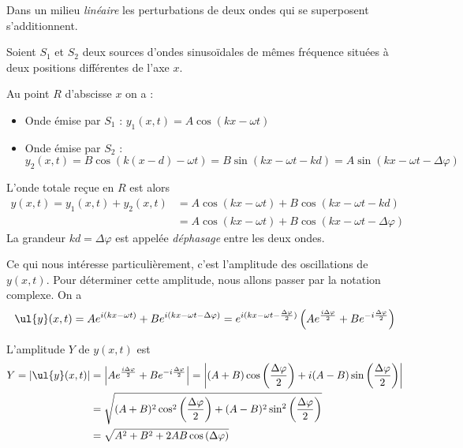 \documentclass[MPSI]{cours}
\begin{document}
Dans un milieu \emph{linéaire} les perturbations de deux ondes qui se superposent s'additionnent.

Soient $S_1$ et $S_2$ deux sources d'ondes sinusoïdales de mêmes fréquence situées à deux positions différentes de l'axe $x$.
\begin{center}
\end{center}

Au point $R$ d'abscisse $x$ on a :
\begin{itemize}
\item Onde émise par $S_1$ : $y_1(x,t) = A\cos(kx-\omega t)$
\item Onde émise par $S_2$ : $y_2(x,t) = B\cos(k(x-d)-\omega t) = B\sin(kx-\omega t-kd) = A\sin(kx-\omega t - \Delta\varphi)$
\end{itemize}

L'onde totale reçue en $R$ est alors 
\begin{align}
  y(x,t)=y_1(x,t) + y_2(x,t) &= A \cos(kx-\omega t) + B \cos(kx-\omega t - kd) \\&= A \cos(kx-\omega t) + B \cos(kx-\omega t - \Delta\varphi)
\end{align} 
La grandeur $kd=\Delta\varphi$ est appelée \emph{déphasage} entre les deux ondes.

Ce qui nous intéresse particulièrement, c'est l'amplitude des oscillations de $y(x, t)$. Pour déterminer cette amplitude, nous allons passer par la notation complexe. On a 
\begin{equation}
  \ul{y}(x, t) = Ae^{i(kx-\omega t)} + Be^{i(kx-\omega t - \Delta\varphi)} = e^{i(kx-\omega t - \frac{\Delta\varphi}{2})}\left( Ae^{\frac{i\Delta\varphi}{2}} + Be^{-i\frac{\Delta\varphi}{2}} \right) 
\end{equation}

L'amplitude $Y$ de $y(x, t)$ est
\begin{align}
  Y = |\ul{y}(x, t)|
  &= \left| Ae^{\frac{i\Delta\varphi}{2}} + Be^{-i\frac{\Delta\varphi}{2}} \right| = 
  \left| 
    (A+B)\cos\left(\frac{\Delta\varphi}{2}\right) + 
   i(A-B) \sin\left(\frac{\Delta\varphi}{2}\right) 
  \right|  \\
  &= \sqrt{(A+B)^2\cos^2\left(\frac{\Delta\varphi}{2}\right) + 
           (A-B)^2\sin^2\left(\frac{\Delta\varphi}{2}\right) }\\
  &= \sqrt{A^2 + B^2 + 2AB\cos\left(\Delta\varphi \right) }
\end{align}
\end{document}
